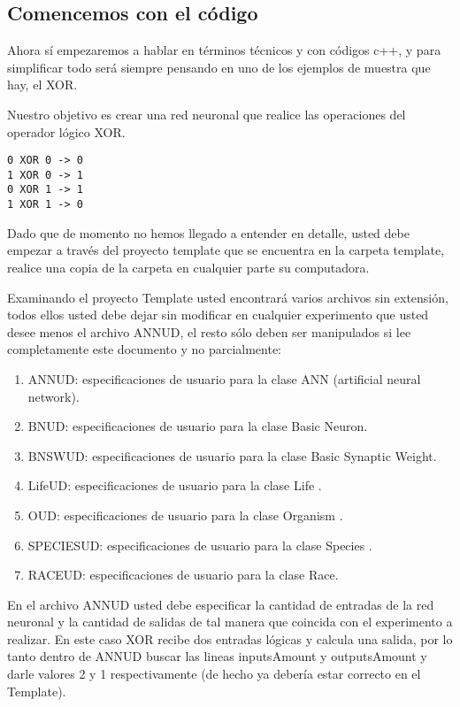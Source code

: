\subsection{Comencemos con el código}

Ahora sí empezaremos a hablar en términos técnicos y con códigos c++, y para simplificar todo será siempre pensando en uno de los ejemplos de muestra que hay, el XOR.\newline

Nuestro objetivo es crear una red neuronal que realice las operaciones del operador lógico XOR.

\begin{lstlisting}
0 XOR 0 -> 0
1 XOR 0 -> 1
0 XOR 1 -> 1
1 XOR 1 -> 0
\end{lstlisting}

Dado que de momento no hemos llegado a entender en detalle, usted debe empezar a través del proyecto template que se encuentra en la carpeta template, realice una copia de la carpeta en cualquier parte su computadora.

Examinando el proyecto Template usted encontrará varios archivos sin extensión, todos ellos usted debe dejar sin modificar en cualquier experimento que usted desee menos el archivo ANNUD, el resto sólo deben ser manipulados si lee completamente este documento y no parcialmente:

\begin{enumerate}
\item ANNUD: especificaciones de usuario para la clase ANN (artificial neural network).
\item BNUD: especificaciones de usuario para la clase Basic Neuron.
\item BNSWUD: especificaciones de usuario para la clase Basic Synaptic Weight.
\item LifeUD: especificaciones de usuario para la clase Life .
\item OUD: especificaciones de usuario para la clase Organism .
\item SPECIESUD: especificaciones de usuario para la clase Species .
\item RACEUD: especificaciones de usuario para la clase Race.
\end{enumerate}

En el archivo ANNUD usted debe especificar la cantidad de entradas de la red neuronal y la cantidad de salidas de tal manera que coincida con el experimento a realizar. En este caso XOR recibe dos entradas lógicas y calcula una salida, por lo tanto dentro de ANNUD buscar las lineas inputsAmount y outputsAmount y darle valores 2 y 1 respectivamente (de hecho ya debería estar correcto en el Template).

